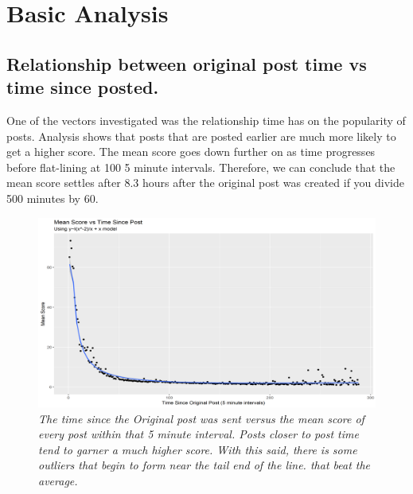 \section {Basic Analysis}

\subsection {Relationship between original post time vs time since posted.}
	One of the vectors investigated was the relationship time has on the popularity of posts. Analysis shows that posts that are posted earlier are much more likely to get a higher score. The mean score goes down further on as time progresses before flat-lining at 100 5 minute intervals. Therefore, we can conclude that the mean score settles after 8.3 hours after the original post was created if you divide 500 minutes by 60.
	\begin{figure}[ht]
		\centering
			\includegraphics[width=1.0\textwidth]{graphs/meanscore_vs_time2}
		\caption{\textit{The time since the Original post was sent versus the mean score of every post within that 5 minute interval. Posts closer to post time tend to garner a much higher score. With this said, there is some outliers that begin to form near the tail end of the line. that beat the average.}}
	\end{figure}

